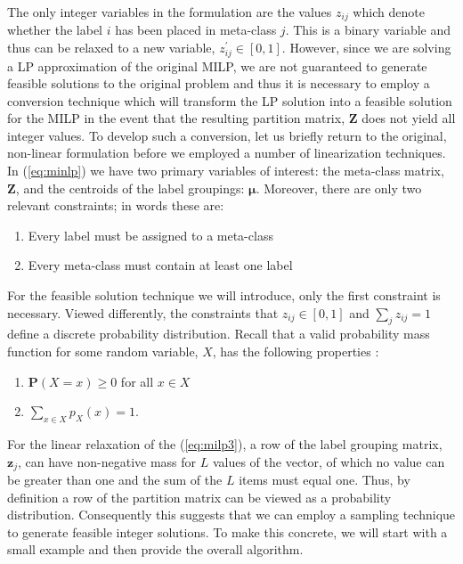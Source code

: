 \documentclass[../thesis.tex]{subfiles}
\begin{document}
The only integer variables in the formulation are the values $z_{ij}$ which
denote whether the label $i$ has been placed in meta-class $j$. This is a binary
variable and thus can be relaxed to a new variable, $z_{ij}^\prime \in [0, 1]$.
However, since we are solving a LP approximation of the original MILP, we are
not guaranteed to generate feasible solutions to the original problem and thus
it is necessary to employ a conversion technique which will transform the LP
solution into a feasible solution for the MILP in the event that the resulting
partition matrix, $\mathbf{Z}$ does not yield all integer values. To develop
such a conversion, let us briefly return to the original, non-linear formulation
before we employed a number of linearization techniques. In (\ref{eq:minlp}) we
have two primary variables of interest: the meta-class matrix, $\mathbf{Z}$, and
the centroids of the label groupings: $\boldsymbol{\mu}$. Moreover, there are
only two relevant constraints; in words these are:
\begin{enumerate}
    \item Every label must be assigned to a meta-class
    \item Every meta-class must contain at least one label
\end{enumerate}
For the feasible solution technique we will introduce, only the first constraint
is necessary. Viewed differently, the constraints that $z_{ij} \in [0, 1]$ and
$\sum_j z_{ij} = 1$ define a discrete probability distribution. Recall that a
valid probability mass function for some random variable, $X$, has the following
properties \cite{blitzstein2014introduction}:
\begin{enumerate}
    \item $\mathbf{P}(X = x) \geq 0$ for all $x \in X$
    \item $\sum_{x \in X} p_X(x) = 1$.
\end{enumerate}
For the linear relaxation of the (\ref{eq:milp3}), a row of the label grouping
matrix, $\mathbf{z}_j$, can have non-negative mass for $L$ values of the vector,
of which no value can be greater than one and the sum of the $L$ items must
equal one. Thus, by definition a row of the partition matrix can be viewed as a
probability distribution. Consequently this suggests that we can employ a
sampling technique to generate feasible integer solutions. To make this
concrete, we will start with a small example and then provide the overall
algorithm.
\end{document}
